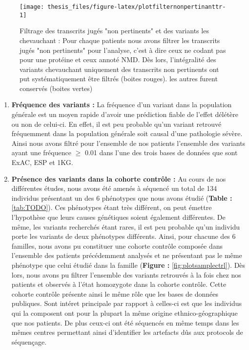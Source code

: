 \documentclass[12pt,twoside]{reedthesis}
\theoremstyle{definition}
\theoremstyle{definition}
\theoremstyle{remark}
\begin{document}
  \begin{figure}
  
  {\centering \texttt{[image: thesis\_files/figure-latex/plotfilternonpertinanttr-1]} 
  
  }
  
  \caption[Filtrage des transcrits jugés "non pertinents" et des variants les chevauchant]{Filtrage des transcrits jugés "non pertinents" et des variants les chevauchant : Pour chaque patients nous avons filtrer les transcrits jugés "non pertinents" pour l'analyse, c'est à dire ceux ne codant pas pour une protéine et ceux annoté NMD. Dès lors, l'intégralité des variants chevauchant uniquement des transcrits non pertinents ont put systématiquement être filtrés (boites rouges). les autres furent conservés (boites vertes)}\label{fig:plotfilternonpertinanttr}
  \end{figure}
  
  \begin{enumerate}
  \def\labelenumi{\arabic{enumi}.}
  \setcounter{enumi}{4}
  \item
    \textbf{Fréquence des variants :} La fréquence d'un variant dans la
    population générale est un moyen rapide d'avoir une prédiction fiable
    de l'effet délétère ou non de celui-ci. En effet, il est peu probable
    qu'un variant retrouvé fréquemment dans la population générale soit
    causal d'une pathologie sévère. Ainsi nous avons filtré pour
    l'ensemble de nos patients l'ensemble des variants ayant une fréquence
    \(\ge\) 0.01 dans l'une des trois bases de données que sont ExAC, ESP
    et 1KG.
  \item
    \textbf{Présence des variants dans la cohorte contrôle :} Au cours de
    nos différentes études, nous avons été amenés à séquencé un total de
    134 individus présentant un des 6 phénotypes que nous avons étudié
    (\textbf{Table : }\ref{tab:TODO}). Ces phénotypes étant très
    différent, on peut émettre l'hypothèse que leurs causes génétiques
    soient également différentes. De même, les variants recherchés étant
    rares, il est peu probable qu'un individu porte les variants de deux
    phénotypes différents. Ainsi, pour chacune des 6 familles, nous avons
    pu constituer une cohorte contrôle composée dans l'ensemble des
    patients précédemment analysés et ne présentant pas le même phénotype
    que celui étudié dans la famille (\textbf{Figure :}
    \ref{fig:plotsamplectrl}). Dès lors, nous avons pu filtrer l'ensemble
    des variants retrouvés à la fois chez nos patients et observés à
    l'état homozygote dans la cohorte contrôle. Cette cohorte contrôle
    présente ainsi le même rôle que les bases de données publiques. Sont
    intéret principale par rapport à celles-ci est que les individus qui
    la composent ont pour la plupart la même origine ethnico-géographique
    que nos patients. De plus ceux-ci ont été séquencés en même temps dans
    les mêmes centres permettant ainsi d'identifier les artefacts dûs aux
    protocols de séquençage.
  \end{enumerate}
  
\end{document}
